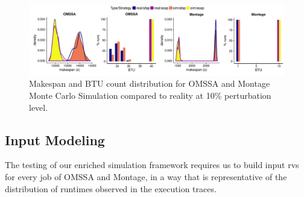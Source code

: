 \documentclass[10pt,conference,compsocconf]{IEEEtran}
\begin{document}

\begin{figure}
	\includegraphics[width=\textwidth]{gfx/fit_plot.pdf}
	\caption{Makespan and BTU count distribution for OMSSA and Montage Monte
	Carlo Simulation compared to reality at 10\% perturbation
	level.}\label{fig:fit}
\end{figure}



\subsection{Input Modeling}\label{sec:im}

The testing of our enriched simulation framework requires us to build input
\acp{rv} for every job of OMSSA and Montage, in a way that is representative of
the distribution of runtimes observed in the execution traces.
\end{document}
